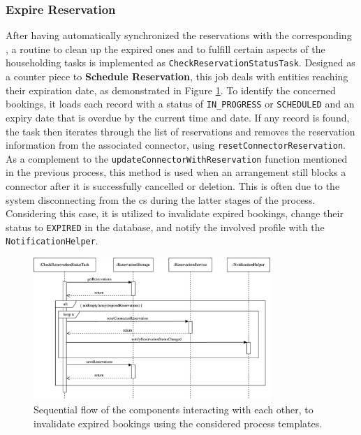 \subsubsection{Expire Reservation}
\label{ch:Implementation:sec:Reservation System:ssec:Scheduling Capabilities:sssec:Expire Reservation}

After having automatically synchronized the reservations with the corresponding , a routine to clean up the expired ones and to fulfill certain aspects of the householding tasks is implemented as \texttt{CheckReservationStatusTask}.
Designed as a counter piece to \textbf{Schedule Reservation}, this job deals with entities reaching their expiration date, as demonstrated in Figure \ref{fig:expire-reservation-seqflow}.
To identify the concerned bookings, it loads each record with a status of \texttt{IN\_PROGRESS} or \texttt{SCHEDULED} and an expiry date that is overdue by the current time and date.
If any record is found, the task then iterates through the list of reservations and removes the reservation information from the associated connector, using \texttt{resetConnectorReservation}. 
As a complement to the \texttt{updateConnectorWithReservation} function mentioned in the previous process, this method is used when an arrangement still blocks a connector after it is successfully cancelled or deletion. This is often due to the system disconnecting from the \acrshort{cs} during the latter stages of the process.
Considering this case, it is utilized to invalidate expired bookings, change their status to \texttt{EXPIRED} in the database, and notify the involved profile with the \texttt{NotificationHelper}.

\begin{figure}[h]
    \centering
    \includegraphics[width=0.8\textwidth,keepaspectratio]{resources/images/main/6_implementation/processes/scheduler/UpdateExpiredReservations.png}
    \caption{Sequential flow of the components interacting with each other, to invalidate expired bookings using the considered process templates.}
    \label{fig:expire-reservation-seqflow}
\end{figure}

